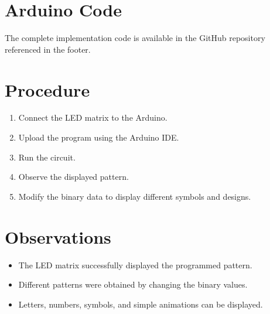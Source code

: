 \documentclass[12pt,a4paper]{report}
\begin{document}
\section{Arduino Code}

The complete implementation code is available in the GitHub repository referenced in the footer.

\thispagestyle{githubpage} %
 








\section{Procedure}

\begin{enumerate}

\item Connect the LED matrix to the Arduino.

\item Upload the program using the Arduino IDE.

\item Run the circuit.

\item Observe the displayed pattern.

\item Modify the binary data to display different symbols and designs.

\end{enumerate}

\section{Observations}

\begin{itemize}

\item The LED matrix successfully displayed the programmed pattern.

\item Different patterns were obtained by changing the binary values.

\item Letters, numbers, symbols, and simple animations can be displayed.

\end{itemize}
\end{document}
